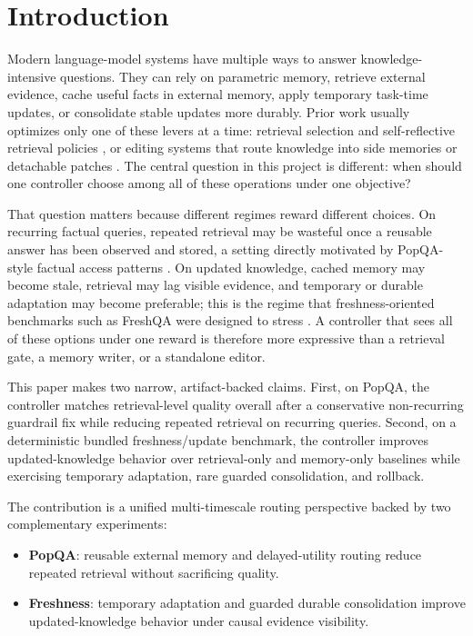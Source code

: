\section{Introduction}

Modern language-model systems have multiple ways to answer knowledge-intensive questions. They can rely on parametric memory, retrieve external evidence, cache useful facts in external memory, apply temporary task-time updates, or consolidate stable updates more durably. Prior work usually optimizes only one of these levers at a time: retrieval selection and self-reflective retrieval policies \citep{asai2024selfrag,yan2024crag}, or editing systems that route knowledge into side memories or detachable patches \citep{wang2024wise,yu2023melo,zhang2024keStudy}. The central question in this project is different: when should one controller choose among all of these operations under one objective?

That question matters because different regimes reward different choices. On recurring factual queries, repeated retrieval may be wasteful once a reusable answer has been observed and stored, a setting directly motivated by PopQA-style factual access patterns \citep{mallen2022trust}. On updated knowledge, cached memory may become stale, retrieval may lag visible evidence, and temporary or durable adaptation may become preferable; this is the regime that freshness-oriented benchmarks such as FreshQA were designed to stress \citep{vu2024freshllms}. A controller that sees all of these options under one reward is therefore more expressive than a retrieval gate, a memory writer, or a standalone editor.

This paper makes two narrow, artifact-backed claims. First, on PopQA, the controller matches retrieval-level quality overall after a conservative non-recurring guardrail fix while reducing repeated retrieval on recurring queries. Second, on a deterministic bundled freshness/update benchmark, the controller improves updated-knowledge behavior over retrieval-only and memory-only baselines while exercising temporary adaptation, rare guarded consolidation, and rollback.

The contribution is a unified multi-timescale routing perspective backed by two complementary experiments:
\begin{itemize}[leftmargin=1.5em]
\item \textbf{PopQA}: reusable external memory and delayed-utility routing reduce repeated retrieval without sacrificing quality.
\item \textbf{Freshness}: temporary adaptation and guarded durable consolidation improve updated-knowledge behavior under causal evidence visibility.
\end{itemize}

